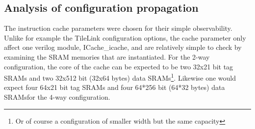 \documentclass[journal,a4paper]{IEEEtran}
\begin{document}
\subsection{Analysis of configuration propagation}
The instruction cache parameters were chosen for their simple observability. Unlike for example the TileLink configuration options, the cache parameter only affect one verilog module, ICache\_icache, and are relatively simple to check by examining the SRAM memories that are instantiated.
For the 2-way configuration, the core of the cache can be expected to be two 32x21 bit tag SRAMs and two 32x512 bit (32x64 bytes) data SRAMs\footnote{\label{note-width}Or of course a configuration of smaller width but the same capacity}.
Likewise one would expect four 64x21 bit tag SRAMs and four 64*256 bit (64*32 bytes) data SRAMs\footnotemark[\ref{note-width}] for the 4-way configuration.

\end{document}
